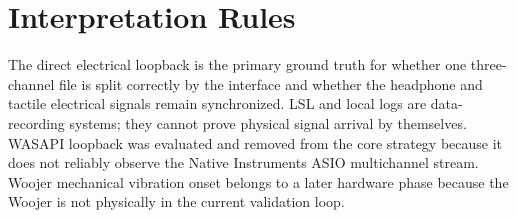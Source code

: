\documentclass[11pt]{article}
\begin{document}
\section{Interpretation Rules}

The direct electrical loopback is the primary ground truth for whether one
three-channel file is split correctly by the interface and whether the
headphone and tactile electrical signals remain synchronized. LSL and local
logs are data-recording systems; they cannot prove physical signal arrival by
themselves. WASAPI loopback was evaluated and removed from the core strategy
because it does not reliably observe the Native Instruments ASIO multichannel
stream. Woojer mechanical vibration onset belongs to a later hardware phase
because the Woojer is not physically in the current validation loop.
\end{document}
